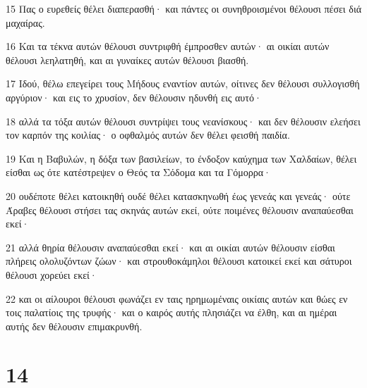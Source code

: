 \par 15 Πας ο ευρεθείς θέλει διαπερασθή· και πάντες οι συνηθροισμένοι θέλουσι πέσει διά μαχαίρας.
\par 16 Και τα τέκνα αυτών θέλουσι συντριφθή έμπροσθεν αυτών· αι οικίαι αυτών θέλουσι λεηλατηθή, και αι γυναίκες αυτών θέλουσι βιασθή.
\par 17 Ιδού, θέλω επεγείρει τους Μήδους εναντίον αυτών, οίτινες δεν θέλουσι συλλογισθή αργύριον· και εις το χρυσίον, δεν θέλουσιν ηδυνθή εις αυτό·
\par 18 αλλά τα τόξα αυτών θέλουσι συντρίψει τους νεανίσκους· και δεν θέλουσιν ελεήσει τον καρπόν της κοιλίας· ο οφθαλμός αυτών δεν θέλει φεισθή παιδία.
\par 19 Και η Βαβυλών, η δόξα των βασιλείων, το ένδοξον καύχημα των Χαλδαίων, θέλει είσθαι ως ότε κατέστρεψεν ο Θεός τα Σόδομα και τα Γόμορρα·
\par 20 ουδέποτε θέλει κατοικηθή ουδέ θέλει κατασκηνωθή έως γενεάς και γενεάς· ούτε Άραβες θέλουσι στήσει τας σκηνάς αυτών εκεί, ούτε ποιμένες θέλουσιν αναπαύεσθαι εκεί·
\par 21 αλλά θηρία θέλουσιν αναπαύεσθαι εκεί· και αι οικίαι αυτών θέλουσιν είσθαι πλήρεις ολολυζόντων ζώων· και στρουθοκάμηλοι θέλουσι κατοικεί εκεί και σάτυροι θέλουσι χορεύει εκεί·
\par 22 και οι αίλουροι θέλουσι φωνάζει εν ταις ηρημωμέναις οικίαις αυτών και θώες εν τοις παλατίοις της τρυφής· και ο καιρός αυτής πλησιάζει να έλθη, και αι ημέραι αυτής δεν θέλουσιν επιμακρυνθή.

\chapter{14}

